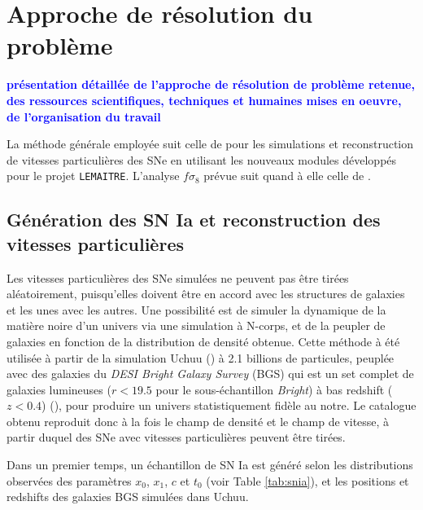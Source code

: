 \documentclass{book}
\newcommand{\consignes}[1]{{\textcolor{blue}{\bf \large #1}}}
\begin{document}
\section{Approche de résolution du problème}
\consignes{présentation détaillée de l’approche de résolution de problème retenue, des ressources scientifiques, techniques et humaines mises en oeuvre, de l’organisation du travail}

La méthode générale employée suit celle de \cite{carreres_growth-rate_2023} pour les simulations et reconstruction de vitesses particulières des SNe en utilisant les nouveaux modules développés pour le projet \verb|LEMAITRE|. L'analyse $f\sigma_8$ prévue suit quand à elle celle de \cite{boruah_cosmic_2020,stahl_peculiar-velocity_2021}.

\subsection{Génération des SN Ia et reconstruction des vitesses particulières}

Les vitesses particulières des SNe simulées ne peuvent pas être tirées aléatoirement, puisqu'elles doivent être en accord avec les structures de galaxies et les unes avec les autres. Une possibilité est de simuler la dynamique de la matière noire d'un univers via une simulation à N-corps, et de la peupler de galaxies en fonction de la distribution de densité obtenue. Cette méthode à été utilisée à partir de la simulation Uchuu (\cite{prada_desi_2023}) à 2.1 billions de particules, peuplée avec des galaxies du \textit{DESI Bright Galaxy Survey} (BGS) qui est un set complet de galaxies lumineuses ($r < 19.5$ pour le sous-échantillon \textit{Bright}) à bas redshift ($z<0.4$) (\cite{hahn_desi_2023}), pour produire un univers statistiquement fidèle au notre. Le catalogue obtenu reproduit donc à la fois le champ de densité et le champ de vitesse, à partir duquel des SNe avec vitesses particulières peuvent être tirées.

Dans un premier temps, un échantillon de SN Ia est généré selon les distributions observées des paramètres $x_0$, $x_1$, $c$ et $t_0$ (voir Table \ref{tab:snia}), et les positions et redshifts des galaxies BGS simulées dans Uchuu.
\end{document}

